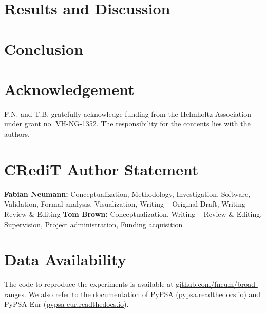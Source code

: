 \documentclass[1p,11pt]{elsarticle}
\begin{document}
\section{Results and Discussion}
\label{sec:results}



\section{Conclusion}
\label{sec:conclusion}



\section*{Acknowledgement}

F.N. and T.B. gratefully acknowledge funding from the Helmholtz
Association under grant no. VH-NG-1352.
The responsibility for the contents lies with the authors.
\doclicenseLongText
\doclicenseIcon

\section*{CRediT Author Statement}

\textbf{Fabian Neumann:} Conceptualization, Methodology, Investigation, Software, Validation, Formal analysis, Visualization, Writing -- Original Draft, Writing -- Review \& Editing
\textbf{Tom Brown:} Conceptualization, Writing -- Review \& Editing, Supervision, Project administration, Funding acquisition

\section*{Data Availability}

The code to reproduce the experiments is available at \href{https://github.com/fneum/broad-ranges}{github.com/fneum/broad-ranges}.
We also refer to the documentation of PyPSA (\href{https://pypsa.readthedocs.io}{pypsa.readthedocs.io}) and
PyPSA-Eur (\href{https://pypsa-eur.readthedocs.io}{pypsa-eur.readthedocs.io}).

\renewcommand{\ttdefault}{\sfdefault}


% 	
\end{document}
